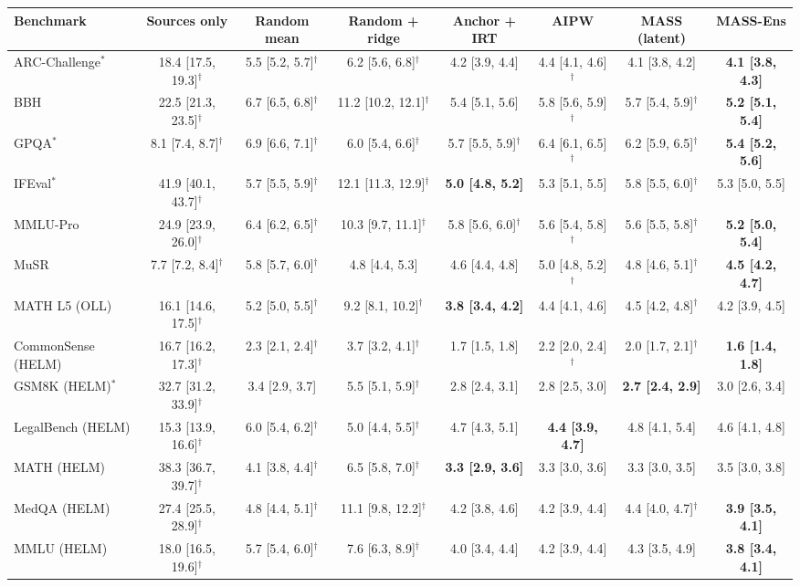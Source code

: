 \begin{tabular}{lccccccc}
\toprule
Benchmark & Sources only & Random mean & Random + ridge & Anchor + IRT & AIPW & MASS (latent) & MASS-Ens \\
\midrule
ARC-Challenge$^*$ & 18.4 [17.5, 19.3]$^\dagger$ & 5.5 [5.2, 5.7]$^\dagger$ & 6.2 [5.6, 6.8]$^\dagger$ & 4.2 [3.9, 4.4] & 4.4 [4.1, 4.6]$^\dagger$ & 4.1 [3.8, 4.2] & \textbf{4.1 [3.8, 4.3]} \\
BBH & 22.5 [21.3, 23.5]$^\dagger$ & 6.7 [6.5, 6.8]$^\dagger$ & 11.2 [10.2, 12.1]$^\dagger$ & 5.4 [5.1, 5.6] & 5.8 [5.6, 5.9]$^\dagger$ & 5.7 [5.4, 5.9]$^\dagger$ & \textbf{5.2 [5.1, 5.4]} \\
GPQA$^*$ & 8.1 [7.4, 8.7]$^\dagger$ & 6.9 [6.6, 7.1]$^\dagger$ & 6.0 [5.4, 6.6]$^\dagger$ & 5.7 [5.5, 5.9]$^\dagger$ & 6.4 [6.1, 6.5]$^\dagger$ & 6.2 [5.9, 6.5]$^\dagger$ & \textbf{5.4 [5.2, 5.6]} \\
IFEval$^*$ & 41.9 [40.1, 43.7]$^\dagger$ & 5.7 [5.5, 5.9]$^\dagger$ & 12.1 [11.3, 12.9]$^\dagger$ & \textbf{5.0 [4.8, 5.2]} & 5.3 [5.1, 5.5] & 5.8 [5.5, 6.0]$^\dagger$ & 5.3 [5.0, 5.5] \\
MMLU-Pro & 24.9 [23.9, 26.0]$^\dagger$ & 6.4 [6.2, 6.5]$^\dagger$ & 10.3 [9.7, 11.1]$^\dagger$ & 5.8 [5.6, 6.0]$^\dagger$ & 5.6 [5.4, 5.8]$^\dagger$ & 5.6 [5.5, 5.8]$^\dagger$ & \textbf{5.2 [5.0, 5.4]} \\
MuSR & 7.7 [7.2, 8.4]$^\dagger$ & 5.8 [5.7, 6.0]$^\dagger$ & 4.8 [4.4, 5.3] & 4.6 [4.4, 4.8] & 5.0 [4.8, 5.2]$^\dagger$ & 4.8 [4.6, 5.1]$^\dagger$ & \textbf{4.5 [4.2, 4.7]} \\
MATH L5 (OLL) & 16.1 [14.6, 17.5]$^\dagger$ & 5.2 [5.0, 5.5]$^\dagger$ & 9.2 [8.1, 10.2]$^\dagger$ & \textbf{3.8 [3.4, 4.2]} & 4.4 [4.1, 4.6] & 4.5 [4.2, 4.8]$^\dagger$ & 4.2 [3.9, 4.5] \\
CommonSense (HELM) & 16.7 [16.2, 17.3]$^\dagger$ & 2.3 [2.1, 2.4]$^\dagger$ & 3.7 [3.2, 4.1]$^\dagger$ & 1.7 [1.5, 1.8] & 2.2 [2.0, 2.4]$^\dagger$ & 2.0 [1.7, 2.1]$^\dagger$ & \textbf{1.6 [1.4, 1.8]} \\
GSM8K (HELM)$^*$ & 32.7 [31.2, 33.9]$^\dagger$ & 3.4 [2.9, 3.7] & 5.5 [5.1, 5.9]$^\dagger$ & 2.8 [2.4, 3.1] & 2.8 [2.5, 3.0] & \textbf{2.7 [2.4, 2.9]} & 3.0 [2.6, 3.4] \\
LegalBench (HELM) & 15.3 [13.9, 16.6]$^\dagger$ & 6.0 [5.4, 6.2]$^\dagger$ & 5.0 [4.4, 5.5]$^\dagger$ & 4.7 [4.3, 5.1] & \textbf{4.4 [3.9, 4.7]} & 4.8 [4.1, 5.4] & 4.6 [4.1, 4.8] \\
MATH (HELM) & 38.3 [36.7, 39.7]$^\dagger$ & 4.1 [3.8, 4.4]$^\dagger$ & 6.5 [5.8, 7.0]$^\dagger$ & \textbf{3.3 [2.9, 3.6]} & 3.3 [3.0, 3.6] & 3.3 [3.0, 3.5] & 3.5 [3.0, 3.8] \\
MedQA (HELM) & 27.4 [25.5, 28.9]$^\dagger$ & 4.8 [4.4, 5.1]$^\dagger$ & 11.1 [9.8, 12.2]$^\dagger$ & 4.2 [3.8, 4.6] & 4.2 [3.9, 4.4] & 4.4 [4.0, 4.7]$^\dagger$ & \textbf{3.9 [3.5, 4.1]} \\
MMLU (HELM) & 18.0 [16.5, 19.6]$^\dagger$ & 5.7 [5.4, 6.0]$^\dagger$ & 7.6 [6.3, 8.9]$^\dagger$ & 4.0 [3.4, 4.4] & 4.2 [3.9, 4.4] & 4.3 [3.5, 4.9] & \textbf{3.8 [3.4, 4.1]} \\
\bottomrule
\end{tabular}
